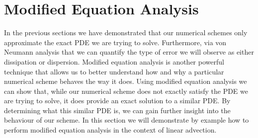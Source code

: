 \chapter{Modified Equation Analysis}
In the previous sections we have demonstrated that our numerical schemes only approximate the exact PDE we are trying to solve. Furthermore, via von Neumann analysis that we can quantify the type of error we will observe as either dissipation or dispersion. Modified equation analysis is another powerful technique that allows us to better understand how and why a particular numerical scheme behaves the way it does. Using modified equation analysis we can show that, while our numerical scheme does not exactly satisfy the PDE we are trying to solve, it does provide an exact solution to a similar PDE. By determining what this similar PDE is, we can gain further insight into the behaviour of our scheme. In this section we will demonstrate by example how to perform modified equation analysis in the context of linear advection.

